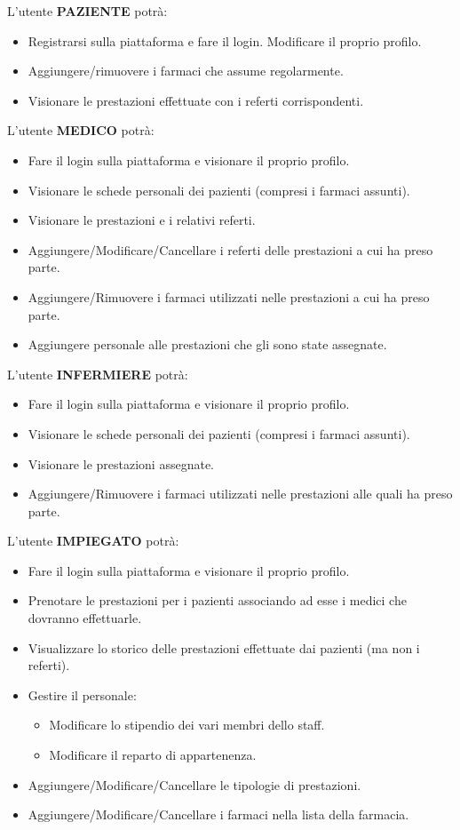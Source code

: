 \documentclass[paper=a4, fontsize=11pt,x11names]{report}
\begin{document}
L'utente \textbf{PAZIENTE} potrà:
\begin{itemize}
\item Registrarsi sulla piattaforma e fare il login. Modificare il proprio profilo.
\item Aggiungere/rimuovere i farmaci che assume regolarmente.
\item Visionare le prestazioni effettuate con i referti corrispondenti.
\end{itemize}

L'utente \textbf{MEDICO} potrà:
\begin{itemize}
\item Fare il login sulla piattaforma e visionare il proprio profilo.
\item Visionare le schede personali dei pazienti (compresi i farmaci assunti).
\item Visionare le prestazioni e i relativi referti.
\item Aggiungere/Modificare/Cancellare i referti delle prestazioni a cui ha preso parte.
\item Aggiungere/Rimuovere i farmaci utilizzati nelle prestazioni a cui ha preso parte.
\item Aggiungere personale alle prestazioni che gli sono state assegnate.
\end{itemize}

L'utente \textbf{INFERMIERE} potrà:
\begin{itemize}
\item Fare il login sulla piattaforma e visionare il proprio profilo.
\item Visionare le schede personali dei pazienti (compresi i farmaci assunti).
\item Visionare le prestazioni assegnate.
\item Aggiungere/Rimuovere i farmaci utilizzati nelle prestazioni alle quali ha preso parte.
\end{itemize}

L'utente \textbf{IMPIEGATO} potrà:
\begin{itemize}
\item Fare il login sulla piattaforma e visionare il proprio profilo.
\item Prenotare le prestazioni per i pazienti associando ad esse i medici che dovranno effettuarle.
\item Visualizzare lo storico delle prestazioni effettuate dai pazienti (ma non i referti). 
\item Gestire il personale:
	\begin{itemize}
		\item Modificare lo stipendio dei vari membri dello staff.
		\item Modificare il reparto di appartenenza.
	\end{itemize}
	
\item Aggiungere/Modificare/Cancellare le tipologie di prestazioni. 
\item Aggiungere/Modificare/Cancellare i farmaci nella lista della farmacia.
\end{itemize}
\end{document}

